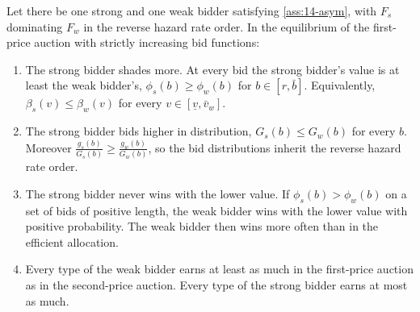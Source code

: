 \begin{proposition}\label{prop:14-maskin-riley}
Let there be one strong and one weak bidder satisfying \cref{ass:14-asym}, with $F_s$ dominating $F_w$
in the reverse hazard rate order. In the equilibrium of the first-price auction with strictly
increasing bid functions:
\begin{enumerate}[label=(\roman*)]
\item The strong bidder shades more. At every bid the strong bidder's value is at least the weak
bidder's, $\phi_s(b)\ge\phi_w(b)$ for $b\in[r,\bar b]$. Equivalently, $\beta_s(v)\le\beta_w(v)$ for
every $v\in[\underline v,\bar v_w]$.
\item The strong bidder bids higher in distribution, $G_s(b)\le G_w(b)$ for every $b$. Moreover
$\frac{g_s(b)}{G_s(b)}\ge\frac{g_w(b)}{G_w(b)}$, so the bid distributions inherit the reverse hazard
rate order.
\item The strong bidder never wins with the lower value. If $\phi_s(b)>\phi_w(b)$ on a set of bids
of positive length, the weak bidder wins with the lower value with positive probability. The weak
bidder then wins more often than in the efficient allocation.
\item Every type of the weak bidder earns at least as much in the first-price auction as in the
second-price auction. Every type of the strong bidder earns at most as much.
\end{enumerate}
\end{proposition}

